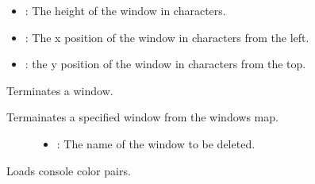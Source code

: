 \documentclass[letterpaper,10pt,english]{sphinxmanual}
\begin{document}
\begin{fulllineitems}
\begin{fulllineitems}
\begin{description}
\begin{itemize}
\item {} 
: The height of the window in characters. 

\item {} 
: The x position of the window in characters from the left. 

\item {} 
: the y position of the window in characters from the top. 

\end{itemize}

\end{description}


\end{fulllineitems}


\begin{fulllineitems}
\label{\detokenize{index:_CPPv2N7ostendo10TermWindowENSt6stringE}}%
\pysigstartmultiline
{}\label{\detokenize{index:Pessumnamespaceostendo_1a8d3e9d8ec26e75c7fd77ef392ecd6e06}}%
\pysigstopmultiline
Terminates a window. 

Termainates a specified window from the windows map. \begin{description}
\item[{}] \leavevmode
{\hyperref[\detokenize{index:Pessumnamespaceostendo_1ab45e3689aa0cb8a2e3a175c0aed97880}]{}} 

\item[{}] \leavevmode\begin{itemize}
\item {} 
: The name of the window to be deleted. 

\end{itemize}

\end{description}


\end{fulllineitems}


\begin{fulllineitems}
\label{\detokenize{index:_CPPv2N7ostendo10LoadColorsEv}}%
\pysigstartmultiline
{}\label{\detokenize{index:Pessumnamespaceostendo_1a892fb62097748762befae0441bcc4f0a}}%
\pysigstopmultiline
Loads console color pairs. 


\end{fulllineitems}
\end{fulllineitems}
\end{document}
